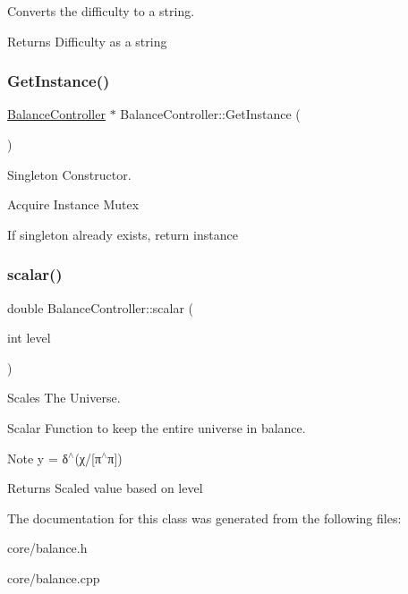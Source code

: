 Converts the difficulty to a string. 

\begin{DoxyReturn}{Returns}
Difficulty as a string 
\end{DoxyReturn}
\mbox{\label{classBalanceController_a570c607b223a0a9c033603e833458251}} 
\subsubsection{\texorpdfstring{Get\+Instance()}{GetInstance()}}
{\footnotesize\ttfamily \mbox{\hyperlink{classBalanceController}{Balance\+Controller}} $\ast$ Balance\+Controller\+::\+Get\+Instance (\begin{DoxyParamCaption}{ }\end{DoxyParamCaption})\hspace{0.3cm}{\ttfamily [static]}}



Singleton Constructor. 

Acquire Instance Mutex

If singleton already exists, return instance \mbox{\label{classBalanceController_a89402d9a7abd85a4fa522f3ad642b6ce}} 
\subsubsection{\texorpdfstring{scalar()}{scalar()}}
{\footnotesize\ttfamily double Balance\+Controller\+::scalar (\begin{DoxyParamCaption}\item[{int}]{level }\end{DoxyParamCaption})}



Scales The Universe. 

Scalar Function to keep the entire universe in balance. \begin{DoxyNote}{Note}
y = δ$^\wedge$(χ/\mbox{[}π$^\wedge$π\mbox{]}) 
\end{DoxyNote}
\begin{DoxyReturn}{Returns}
Scaled value based on level 
\end{DoxyReturn}


The documentation for this class was generated from the following files\+:\begin{DoxyCompactItemize}
\item 
core/balance.\+h\item 
core/balance.\+cpp\end{DoxyCompactItemize}
